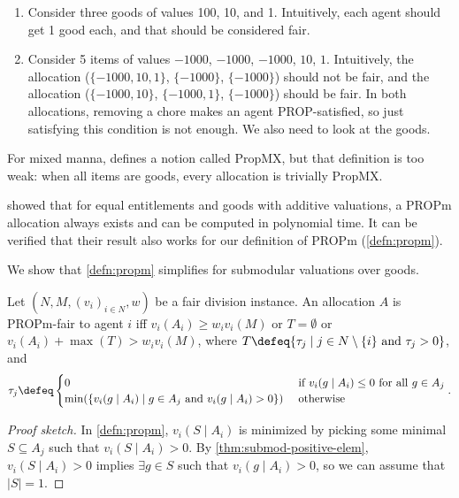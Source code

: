 \begin{enumerate}
\item Consider three goods of values 100, 10, and 1.
    Intuitively, each agent should get 1 good each, and that should be considered fair.
\item Consider 5 items of values $-1000$, $-1000$, $-1000$, $10$, $1$.
    Intuitively, the allocation ($\{-1000, 10, 1\}$, $\{-1000\}$, $\{-1000\}$) should not be fair,
    and the allocation ($\{-1000, 10\}$, $\{-1000, 1\}$, $\{-1000\}$) should be fair.
    In both allocations, removing a chore makes an agent PROP-satisfied, so just
    satisfying this condition is not enough. We also need to look at the goods.
\end{enumerate}

For mixed manna, \cite{livanos2022almost} defines a notion called PropMX,
but that definition is too weak: when all items are goods, every allocation is trivially PropMX.

\cite{baklanov2021propm} showed that for equal entitlements and goods with additive valuations,
a PROPm allocation always exists and can be computed in polynomial time.
It can be verified that their result also works for our definition of PROPm (\cref{defn:propm}).

We show that \cref{defn:propm} simplifies for submodular valuations over goods.

\begin{lemma}
\label{thm:propm-submod-goods}
Let $(N, M, (v_i)_{i \in N}, w)$ be a fair division instance.
An allocation $A$ is PROPm-fair to agent $i$ iff $v_i(A_i) \ge w_iv_i(M)$
or $T = \emptyset$ or $v_i(A_i) + \max(T) > w_iv_i(M)$, where
$T \defeq \{\tau_j \mid j \in N \setminus \{i\} \textrm{ and } \tau_j > 0\}$, and
\[ \tau_j \defeq \begin{cases}
0 & \textrm{ if } v_i(g \mid A_i) \le 0 \textrm{ for all } g \in A_j
\\ \min(\{v_i(g \mid A_i) \mid g \in A_j \textrm{ and } v_i(g \mid A_i) > 0\}) & \textrm{ otherwise}
\end{cases}. \]
\end{lemma}
\begin{proof}[Proof sketch]
In \cref{defn:propm}, $v_i(S \mid A_i)$ is minimized by picking
some minimal $S \subseteq A_j$ such that $v_i(S \mid A_i) > 0$.
By \cref{thm:submod-positive-elem}, $v_i(S \mid A_i) > 0$ implies $\exists g \in S$
such that $v_i(g \mid A_i) > 0$, so we can assume \wLoG{} that $|S| = 1$.
\end{proof}
